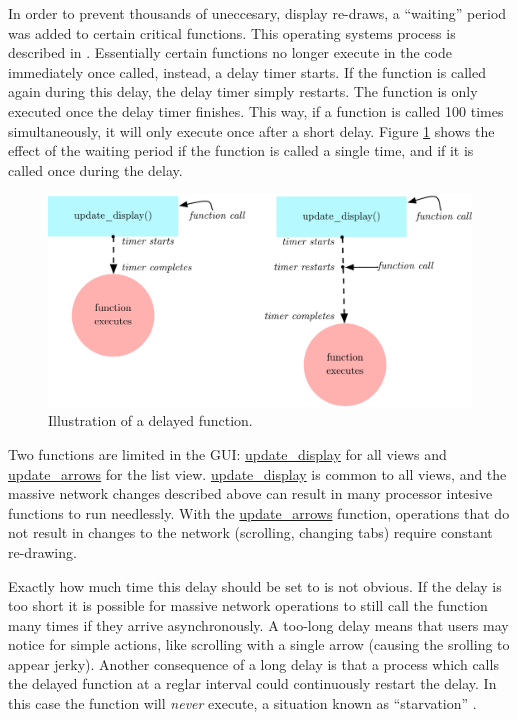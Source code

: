 In order to prevent thousands of uneccesary, display re-draws, a ``waiting'' period was added to certain critical functions. This operating systems process is described in . Essentially certain functions no longer execute in the code immediately once called, instead, a delay timer starts. If the function is called again during this delay, the delay timer simply restarts. The function is only executed once the delay timer finishes. This way, if a function is called 100 times simultaneously, it will only execute once after a short delay. Figure \ref{fig:waiting_period} shows the effect of the waiting period if the function is called a single time, and if it is called once during the delay.

\begin{figure}[ht]
	\centering
		\includegraphics[width=1\textwidth]{figures/waiting_period}
		\caption{Illustration of a delayed function.}
		\label{fig:waiting_period}
\end{figure}

Two functions are limited in the GUI: \url{update_display} for all views and \url{update_arrows} for the list view. \url{update_display} is common to all views, and the massive network changes described above can result in many processor intesive functions to run needlessly. With the \url{update_arrows} function, operations that do not result in changes to the network (scrolling, changing tabs) require constant re-drawing.

Exactly how much time this delay should be set to is not obvious. If the delay is too short it is possible for massive network operations to still call the function many times if they arrive asynchronously. A too-long delay means that users may notice for simple actions, like scrolling with a single arrow (causing the srolling to appear jerky). Another consequence of a long delay is that a process which calls the delayed function at a reglar interval could continuously restart the delay. In this case the function will \emph{never} execute, a situation known as ``starvation'' .
	
